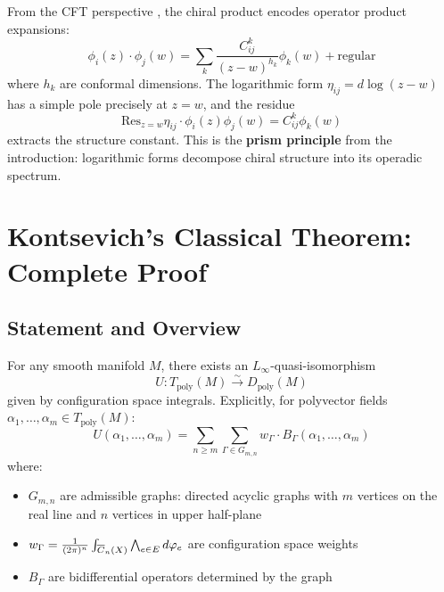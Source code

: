 From the CFT perspective \cite{BPZ, Witten}, the chiral product encodes operator product expansions:
$$\phi_i(z) \cdot \phi_j(w) = \sum_k \frac{C^k_{ij}}{(z-w)^{h_k}} \phi_k(w) + \text{regular}$$
where $h_k$ are conformal dimensions. The logarithmic form $\eta_{ij} = d\log(z-w)$ has a simple pole precisely at $z = w$, and the residue
$$\text{Res}_{z = w} \eta_{ij} \cdot \phi_i(z)\phi_j(w) = C^k_{ij} \phi_k(w)$$
extracts the structure constant. This is the \textbf{prism principle} from the introduction: logarithmic forms decompose chiral structure into its operadic spectrum.

\section{Kontsevich's Classical Theorem: Complete Proof}
\label{sec:kontsevich-classical}

\subsection{Statement and Overview}

\begin{theorem}
\label{thm:kontsevich-formality}
For any smooth manifold $M$, there exists an $L_\infty$-quasi-isomorphism
$$U: T_{\text{poly}}(M) \xrightarrow{\sim} D_{\text{poly}}(M)$$
given by configuration space integrals. Explicitly, for polyvector fields $\alpha_1, \ldots, \alpha_m \in T_{\text{poly}}(M)$:
$$U(\alpha_1, \ldots, \alpha_m) = \sum_{n \geq m} \sum_{\Gamma \in G_{m,n}} w_\Gamma \cdot B_\Gamma(\alpha_1, \ldots, \alpha_m)$$
where:
\begin{itemize}
\item $G_{m,n}$ are admissible graphs: directed acyclic graphs with $m$ vertices on the real line and $n$ vertices in upper half-plane
\item $w_\Gamma = \frac{1}{(2\pi)^n} \int_{\overline{C}_{n}(X)} \bigwedge_{e \in E} d\varphi_e$ are configuration space weights
\item $B_\Gamma$ are bidifferential operators determined by the graph
\end{itemize}
\end{theorem}

